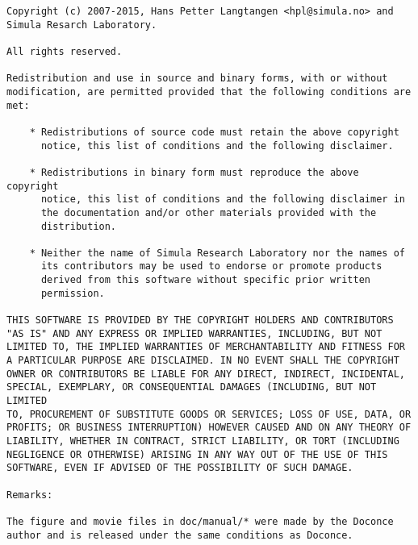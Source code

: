 \documentclass[%
oneside,                 %
final,                   %
chapterprefix=true,      %
open=right,              %
10pt]{book}
\begin{document}
\begin{Verbatim}[numbers=none,fontsize=\fontsize{9pt}{9pt},baselinestretch=0.95]
Copyright (c) 2007-2015, Hans Petter Langtangen <hpl@simula.no> and
Simula Resarch Laboratory.

All rights reserved.

Redistribution and use in source and binary forms, with or without
modification, are permitted provided that the following conditions are
met:

    * Redistributions of source code must retain the above copyright
      notice, this list of conditions and the following disclaimer.

    * Redistributions in binary form must reproduce the above copyright
      notice, this list of conditions and the following disclaimer in
      the documentation and/or other materials provided with the
      distribution.

    * Neither the name of Simula Research Laboratory nor the names of
      its contributors may be used to endorse or promote products
      derived from this software without specific prior written
      permission.

THIS SOFTWARE IS PROVIDED BY THE COPYRIGHT HOLDERS AND CONTRIBUTORS
"AS IS" AND ANY EXPRESS OR IMPLIED WARRANTIES, INCLUDING, BUT NOT
LIMITED TO, THE IMPLIED WARRANTIES OF MERCHANTABILITY AND FITNESS FOR
A PARTICULAR PURPOSE ARE DISCLAIMED. IN NO EVENT SHALL THE COPYRIGHT
OWNER OR CONTRIBUTORS BE LIABLE FOR ANY DIRECT, INDIRECT, INCIDENTAL,
SPECIAL, EXEMPLARY, OR CONSEQUENTIAL DAMAGES (INCLUDING, BUT NOT LIMITED
TO, PROCUREMENT OF SUBSTITUTE GOODS OR SERVICES; LOSS OF USE, DATA, OR
PROFITS; OR BUSINESS INTERRUPTION) HOWEVER CAUSED AND ON ANY THEORY OF
LIABILITY, WHETHER IN CONTRACT, STRICT LIABILITY, OR TORT (INCLUDING
NEGLIGENCE OR OTHERWISE) ARISING IN ANY WAY OUT OF THE USE OF THIS
SOFTWARE, EVEN IF ADVISED OF THE POSSIBILITY OF SUCH DAMAGE.

Remarks:

The figure and movie files in doc/manual/* were made by the Doconce
author and is released under the same conditions as Doconce.


\end{Verbatim}

\end{document}
